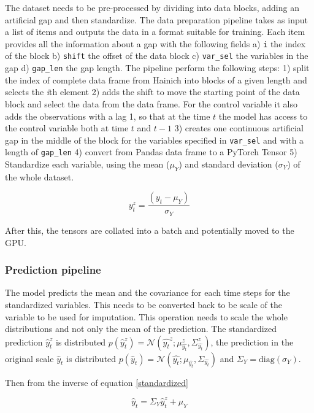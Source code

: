 \documentclass{article}
\newcommand{\norm}[3]{\mathcal{N}\left(#1; #2, #3\right)} %
\begin{document}
The dataset needs to be pre-processed by dividing into data blocks, adding an artificial gap and then standardize. The data preparation pipeline takes as input a list of items and outputs the data in a format suitable for training. Each item provides all the information about a gap with the following fields a) \verb|i| the index of the block b) \verb|shift|  the offset of the data block c) \verb|var_sel| the variables in the gap d) \verb|gap_len| the gap length. The pipeline perform the following steps: 1) split the index of complete data frame from Hainich into blocks of a given length and selects the \textit{i}th element  2) adds the shift to move the starting point of the data block and select the data from the data frame. For the control variable it also adds the observations with a lag 1, so that at the time $t$ the model has access to the control variable both at time $t$ and $t-1$ 3) creates one continuous artificial gap in the middle of the block for the variables specified in \verb|var_sel| and with a length of \verb|gap_len| 4) convert from Pandas data frame to a PyTorch Tensor 5) Standardize each variable, using the mean ($\mu_Y$) and standard deviation ($\sigma_Y$) of the whole dataset.

\begin{equation}\label{standardized}
    y^z_t = \frac{(y_t - \mu_Y)}{\sigma_Y}
\end{equation}

After this, the tensors are collated into a batch and potentially moved to the GPU.

\subsubsection{Prediction pipeline}

The model predicts the mean and the covariance for each time steps for the standardized variables. This needs to be converted back to be scale of the variable to be used for imputation. This operation needs to scale the whole distributions and not only the mean of the prediction. The standardized prediction $\hat{y}^z_t$ is distributed $p(\hat{y}^z_t) = \norm{\hat{y_t}^z}{\mu^z_{\hat{y_t}}}{\Sigma^z_{\hat{y_t}}}$, the prediction in the original scale $\hat{y}_t$ is distributed $p(\hat{y}_t) =  \norm{\hat{y_t}}{\mu_{\hat{y_t}}}{\Sigma_{\hat{y_t}}}$ and $\Sigma_Y = \text{diag}(\sigma_Y)$. 

Then from the inverse of equation \ref{standardized}

\begin{equation}
    \hat{y}_t = \Sigma_Y\hat{y}^z_t + \mu_Y
\end{equation}
\end{document}
